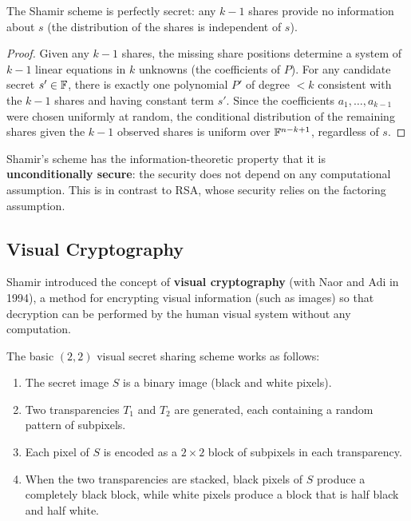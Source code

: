 \begin{theorem}
The Shamir scheme is perfectly secret: any $k-1$ shares provide no information about $s$ (the distribution of the shares is independent of $s$).
\end{theorem}

\begin{proof}
Given any $k-1$ shares, the missing share positions determine a system of $k-1$ linear equations in $k$ unknowns (the coefficients of $P$). For any candidate secret $s' \in \mathbb{F}$, there is exactly one polynomial $P'$ of degree $< k$ consistent with the $k-1$ shares and having constant term $s'$. Since the coefficients $a_1, \ldots, a_{k-1}$ were chosen uniformly at random, the conditional distribution of the remaining shares given the $k-1$ observed shares is uniform over $\mathbb{F}^{n-k+1}$, regardless of $s$.
\end{proof}

\begin{remark}
Shamir's scheme has the information-theoretic property that it is \textbf{unconditionally secure}: the security does not depend on any computational assumption. This is in contrast to RSA, whose security relies on the factoring assumption.
\end{remark}

\subsection{Visual Cryptography}

Shamir introduced the concept of \textbf{visual cryptography} (with Naor and Adi in 1994), a method for encrypting visual information (such as images) so that decryption can be performed by the human visual system without any computation.

The basic $(2,2)$ visual secret sharing scheme works as follows:
\begin{enumerate}
    \item The secret image $S$ is a binary image (black and white pixels).
    \item Two transparencies $T_1$ and $T_2$ are generated, each containing a random pattern of subpixels.
    \item Each pixel of $S$ is encoded as a $2 \times 2$ block of subpixels in each transparency.
    \item When the two transparencies are stacked, black pixels of $S$ produce a completely black block, while white pixels produce a block that is half black and half white.
\end{enumerate}

